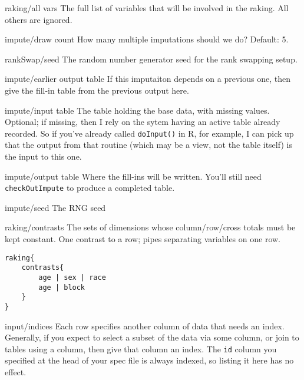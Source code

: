 \begin{key}{    raking/all vars}
     The full list of variables that will be involved in the
       raking. All others are ignored. 
\end{key}

\begin{key}{  impute/draw count}
   How many multiple imputations should we do? Default: 5.
\end{key}

\begin{key}{rankSwap/seed}
 The random number generator seed for the rank swapping setup.
\end{key}

\begin{key}{  impute/earlier output table}
   If this imputaiton depends on a previous one, then give the fill-in table from the previous output here.
 
\end{key}

\begin{key}{impute/input table}
 The table holding the base data, with missing values. 
  Optional; if missing, then I rely on the sytem having an active table already recorded. So if you've already called {\tt doInput()} in R, for example, I can pick up that the output from that routine (which may be a view, not the table itself) is the input to this one. 
\end{key}

\begin{key}{  impute/output table}
   Where the fill-ins will be written. You'll still need {\tt checkOutImpute} to produce a completed table.
\end{key}

\begin{key}{  impute/seed}
   The RNG seed
\end{key}

\begin{key}{raking/contrasts}
 The sets of dimensions whose column/row/cross totals must be kept constant. One contrast to a row; pipes separating variables on one row.
\begin{lstlisting}
raking{
    contrasts{
        age | sex | race
        age | block
    }
}
\end{lstlisting} 
\end{key}

\begin{key}{input/indices}
 Each row specifies another column of data that needs an index. Generally, if you expect to select a subset of the data via some column, or join to tables using a column, then give that column an index. The {\tt id} column you specified at the head of your spec file is always indexed, so listing it here has no effect.
\end{key}

